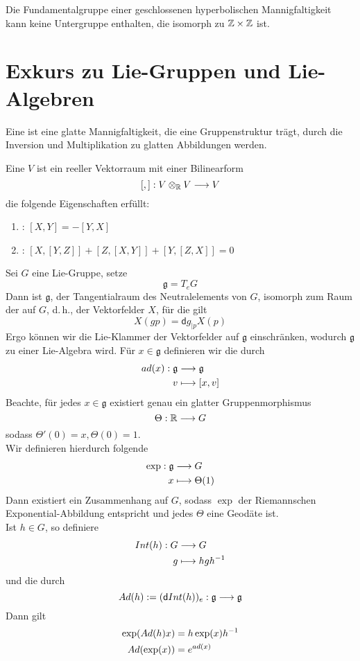 \documentclass{book}
\renewcommand{\d}{\textsf{d}}
\newcommand{\g}{\mathfrak{g}}
\begin{document}
\Kor{}
Die Fundamentalgruppe einer geschlossenen hyperbolischen Mannigfaltigkeit kann keine Untergruppe enthalten, die isomorph zu $\mathbb{Z}\times \mathbb{Z}$ ist.

\section{Exkurs zu Lie-Gruppen und Lie-Algebren}

\Def{}
Eine  ist eine glatte Mannigfaltigkeit, die eine Gruppenstruktur trägt, durch die Inversion und Multiplikation zu glatten Abbildungen werden.

\Def{}
Eine  $V$ ist ein reeller Vektorraum mit einer Bilinearform
\[ [,] : V\otimes_{\mathbb{R}} V \overset{}{\longrightarrow} V \]
die folgende Eigenschaften erfüllt:
\begin{enumerate}[1.)]
	\item {}: $[X,Y] = -[Y,X]$
	\item {}: $[X,[Y,Z]] + [Z,[X,Y]] + [Y,[Z,X]] = 0$
\end{enumerate}


\Bem{}
Sei $G$ eine Lie-Gruppe, setze
\[ \g = T_eG \]
Dann ist $\g$, der Tangentialraum des Neutralelements von $G$, isomorph zum Raum der  auf $G$, d.\,h., der Vektorfelder $X$, für die gilt
\[ X(gp) = \d g_{|p}X(p) \]
Ergo können wir die Lie-Klammer der Vektorfelder auf $\g$ einschränken, wodurch $\g$ zu einer Lie-Algebra wird. Für $x\in\g$ definieren wir die  durch
\begin{align*}
ad(x) : \g & \Pfeil{} \g\\
v & \longmapsto [x,v]
\end{align*}
Beachte, für jedes $x \in \g$ existiert genau ein glatter Gruppenmorphismus
\[ \Theta : \mathbb{R} \overset{}{\longrightarrow} G \]
sodass $\Theta'(0) = x, \Theta(0) = 1$.\\
Wir definieren hierdurch folgende 
\begin{align*}
\exp : \g &\Pfeil{} G\\
x &\longmapsto \Theta(1)
\end{align*}
Dann existiert ein Zusammenhang auf $G$, sodass $\exp$ der Riemannschen Exponential-Abbildung entspricht und jedes $\Theta$ eine Geodäte ist.\\
Ist $h\in G$, so definiere
\begin{align*}
Int(h) :G& \overset{}{\longrightarrow} G\\
g & \longmapsto hgh^{-1}
\end{align*}
und die  durch
\[ Ad(h) := (\d Int(h))_{e} : \g \Pfeil{} \g \]
Dann gilt
\begin{align*}
\exp(Ad(h)x) &= h\exp(x)h^{-1}\\
Ad(\exp(x)) &= e^{ad(x)}
\end{align*}
\end{document}
